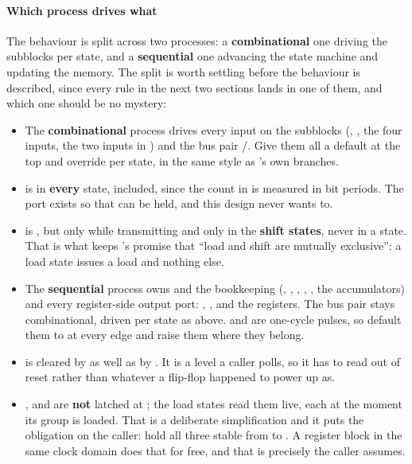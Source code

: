 \paragraph{Which process drives what}
The behaviour is split across two processes: a \textbf{combinational} one driving the subblocks per
state, and a \textbf{sequential} one advancing the state machine and updating the memory. The split
is worth settling before the behaviour is described, since every rule in the next two sections lands
in one of them, and which one should be no mystery:
\begin{itemize}
  \item The \textbf{combinational} process drives every input on the subblocks (,
    , the four  inputs, the two  inputs in
    ) and the bus pair /. Give them all a default at the
    top and override per state, in the same style as 's own branches.
  \item {} is  in \textbf{every} state,  included, since the
    count in  is measured in bit periods. The port exists so that 
    can be held, and this design never wants to.
  \item {} is , but only while transmitting and only in the
    \textbf{shift states}, never in a  state. That is what keeps
    's promise that ``load and shift are mutually exclusive'': a load state issues a
    load and nothing else.
  \item The \textbf{sequential} process owns  and the bookkeeping (,
    , , , , the
     accumulators) and every register-side output port: ,
    ,  and the  registers. The bus pair stays combinational,
    driven per state as above.  and  are one-cycle pulses, so default
    them to  at every edge and raise them where they belong.
  \item {} is cleared by  as well as by . It is a level a
    caller polls, so it has to read  out of reset rather than whatever a flip-flop happened
    to power up as.
  \item {},  and  are \textbf{not} latched at
    ; the load states read them live, each at the moment its group is loaded. That
    is a deliberate simplification and it puts the obligation on the caller: hold all three stable
    from  to . A register block in the same clock domain does that for
    free, and that is precisely the caller  assumes.
\end{itemize}

